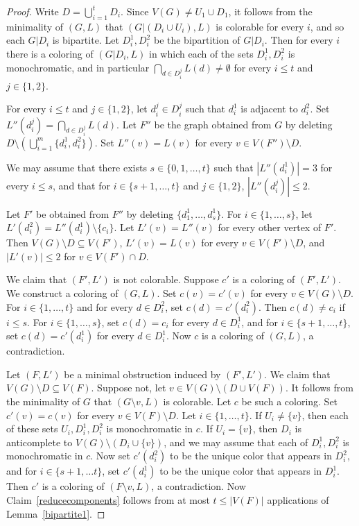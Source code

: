 \documentclass[11pt]{article}
\begin{document}
\begin{proof}
Write $D=\bigcup_{i=1}^t D_i$.
Since $V(G) \neq U_1 \cup D_1$, it follows from the minimality of $(G,L)$ 
that $(G|(D_i \cup U_i),L)$ is colorable for every $i$, and so 
each $G|D_i$ is bipartite. Let $D_i^1,D_i^2$ be the bipartition of $G|D_i$.
Then for every $i$ there is  a coloring of $(G|D_i,L) $ in which each of the 
sets $D_i^1,D_i^2$ is monochromatic, and in particular
$\bigcap_{d \in D_i^j}L(d) \neq \emptyset$ for every $i \leq t$ and 
$j \in \{1,2\}$.


For every $i \leq t$ and $j \in \{1,2\}$, let $d_i^j \in D_i^j$ such that
$d_i^1$ is adjacent to $d_i^2$. Set $L''(d_i^j)=\bigcap_{d \in D_i^j}L(d)$.
Let $F''$ be the graph obtained from $G$ by deleting
$D \setminus (\bigcup_{i=1}^m\{d_i^1,d_i^2\})$.
Set $L''(v)=L(v)$ for every $v \in V(F'') \setminus D$.
 
We may assume that there exists $s \in \{0,1, \ldots, t\}$ such that
$|L''(d_i^1)|=3$ for every  $i \leq s$, and that
for $i \in \{s+1, \ldots, t\}$ and $j \in \{1,2\}$, $|L''(d_i^j)| \leq 2$.

Let $F'$ be obtained from $F''$ by deleting $\{d_1^1, \ldots, d_s^1\}$.
For $i \in \{1, \ldots, s\}$, let $L'(d_i^2)=L''(d_i^1) \setminus  \{c_i\}$. 
Let $L'(v)=L''(v)$ for every other 
vertex of $F'$. Then $V(G) \setminus D \subseteq V(F')$, 
$L'(v)=L(v)$ for every $v \in V(F') \setminus D$, and $|L'(v)| \leq 2$
for $v \in V(F') \cap D$. 



We claim  that $(F',L')$ is not colorable. Suppose $c'$ is a coloring of
$(F',L')$.  We construct a coloring of $(G,L)$. Set
$c(v)=c'(v)$ for every $v \in V(G) \setminus D$. 
For $i \in \{1, \ldots, t\}$ and for  every $d \in D_i^2$,
set $c(d)=c'(d_i^2)$. Then $c(d) \neq c_i$ if $i \leq s$. For 
$i \in \{1, \ldots, s\}$, set $c(d)=c_i$ for every $d \in D_i^1$, 
and for $i \in \{s+1, \ldots, t\}$, set $c(d)=c'(d_i^1)$ for every 
$d \in D_i^1$. Now $c$ is a coloring of $(G,L)$, a contradiction.

Let $(F,L')$ be a minimal obstruction induced by $(F',L')$.
We claim that $V(G) \setminus D \subseteq V(F)$. Suppose not, 
let $v \in V(G) \setminus (D \cup V(F))$.
It follows from the minimality of $G$ that
$(G\setminus v, L)$ is colorable. Let $c$ be such a coloring. 
Set $c'(v)=c(v)$ for every $v \in V(F) \setminus D$. 
Let $i \in \{1, \ldots, t\}$. If $U_i \neq \{v\}$, then
each of these sets $U_i,D_i^1,D_i^2$ is monochromatic in $c$.
If $U_i=\{v\}$, then $D_i$ is anticomplete to $V(G) \setminus (D_i \cup \{v\})$, and  we may assume that each of $D_i^1,D_i^2$ is monochromatic in $c$.
Now set $c'(d_i^2)$ to be the
unique color that appears in $D_i^2$, and for $i \in \{s+1, \ldots t\}$,
set $c'(d_i^1)$ to be the unique color that appears in $D_i^1$. Then
$c'$ is a coloring of $(F \setminus v, L)$, a contradiction.
Now Claim~\ref{reducecomponents} follows from at most $t \leq |V(F)|$ 
applications of Lemma~\ref{bipartite1}.
\end{proof}
\end{document}
